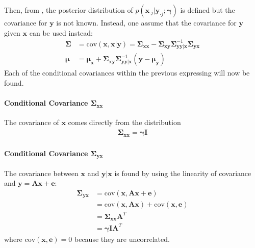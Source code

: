 Then, from \cite{conditional_cov}, the posterior distribution of $p\left( \mathbf{x}_{\cdot j} \vert \mathbf{y}_{\cdot j} ; \boldsymbol{\gamma} \right)$ is defined but the covariance for $\mathbf{y}$ is not known. Instead, one assume that the covariance for $\mathbf{y}$ given $\mathbf{x}$ can be used instead:
\begin{align*}
\boldsymbol{\Sigma} &= \text{cov}(\mathbf{x} , \mathbf{x} \vert \mathbf{y}) = \boldsymbol{\Sigma}_{\mathbf{xx}} - \boldsymbol{\Sigma}_{\mathbf{xy}} \boldsymbol{\Sigma}_{\mathbf{yy} \vert \mathbf{x}}^{-1} \boldsymbol{\Sigma}_{\mathbf{yx}} \\
\boldsymbol{\mu} &= \boldsymbol{\mu}_{\mathbf{x}} + \boldsymbol{\Sigma}_{\mathbf{xy}} \boldsymbol{\Sigma}_{\mathbf{yy} \vert \mathbf{x}}^{-1} (\mathbf{y} - \boldsymbol{\mu}_{\mathbf{y}})
\end{align*}
Each of the conditional covariances within the previous expressing will now be found.

\paragraph{Conditional Covariance $\boldsymbol{\Sigma}_{\mathbf{xx}}$}
The covariance of $\mathbf{x}$ comes directly from the distribution  
\begin{align*}
\boldsymbol{\Sigma}_{\mathbf{xx}} = \boldsymbol{\gamma} \mathbf{I}
\end{align*} 

\paragraph{Conditional Covariance $\boldsymbol{\Sigma}_{\mathbf{yx}}$}
The covariance between $\mathbf{x}$ and $\mathbf{y} \vert \mathbf{x}$ is found by using the linearity of covariance and $\mathbf{y} = \mathbf{Ax} + \mathbf{e}$:
\begin{align*}
\boldsymbol{\Sigma}_{\mathbf{yx}} &= \text{cov} \left(\mathbf{x} , \mathbf{Ax} + \mathbf{e} \right) \\ 
&= \text{cov} \left(\mathbf{x} , \mathbf{Ax} \right) + \text{cov} \left(\mathbf{x} , \mathbf{e} \right) \\
&= \boldsymbol{\Sigma}_{\mathbf{xx}} \mathbf{A}^T \\
&= \boldsymbol{\gamma} \mathbf{I} \mathbf{A}^T
\end{align*}
where $\text{cov} \left(\mathbf{x} , \mathbf{e} \right) = 0$ because they are uncorrelated.


